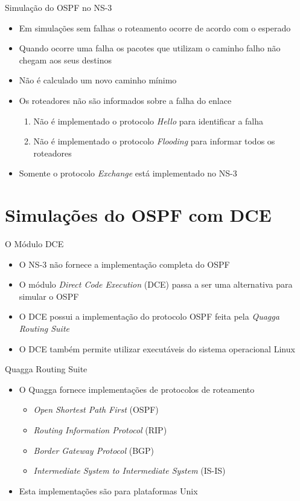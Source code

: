 \documentclass{beamer}
\newlength{\wideitemsep}
\let\olditem\item
\renewcommand{\item}{\setlength{\itemsep}{\wideitemsep}\olditem}
\begin{document}
\begin{frame}{Simulação do OSPF no NS-3}
\begin{itemize}
 \item Em simulações sem falhas o roteamento ocorre de acordo com o esperado %
 \item Quando ocorre uma falha os pacotes que utilizam o caminho falho não chegam aos seus destinos %
 \item Não é calculado um novo caminho mínimo %
 \item Os roteadores não são informados sobre a falha do enlace %
  \begin{enumerate}
   \olditem Não é implementado o protocolo \textit{Hello} para identificar a falha %
   \olditem Não é implementado o protocolo \textit{Flooding} para informar todos os roteadores %
  \end{enumerate}
 \item Somente o protocolo \textit{Exchange} está implementado no NS-3 %
\end{itemize}
\end{frame}

\section{Simulações do OSPF com DCE} %
\begin{frame}{O Módulo DCE}
\begin{itemize}
 \item O NS-3 não fornece a implementação completa do OSPF %
 \item O módulo \textit{Direct Code Execution} (DCE) passa a ser uma alternativa para simular o OSPF %
 \item O DCE possui a implementação do protocolo OSPF feita pela \textit{Quagga Routing Suite} %
 \item O DCE também permite utilizar executáveis do sistema operacional Linux %
\end{itemize}
\end{frame}

\begin{frame}{Quagga Routing Suite}
\begin{itemize}
 \item O Quagga fornece implementações de protocolos de roteamento %
  \begin{itemize}
   \olditem \textit{Open Shortest Path First} (OSPF) %
   \olditem \textit{Routing Information Protocol} (RIP) %
   \olditem \textit{Border Gateway Protocol} (BGP) %
   \olditem \textit{Intermediate System to Intermediate System} (IS-IS) %
  \end{itemize}
 \item Esta implementações são para plataformas Unix %
\end{itemize}
\end{frame}
\end{document}
